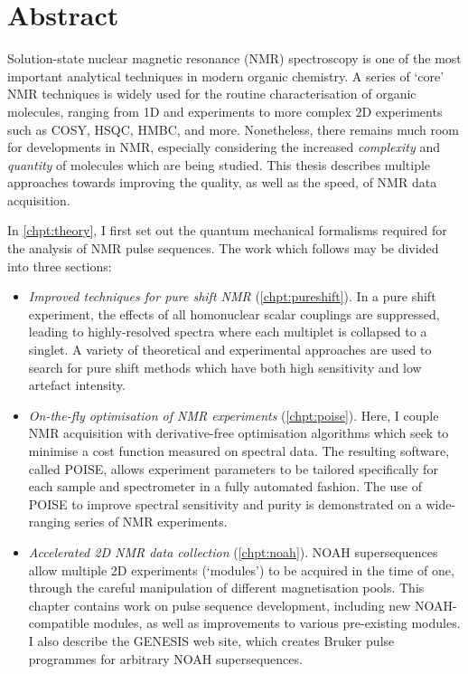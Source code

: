 \chapter{Abstract}

Solution-state nuclear magnetic resonance (NMR) spectroscopy is one of the most important analytical techniques in modern organic chemistry.
A series of `core' NMR techniques is widely used for the routine characterisation of organic molecules, ranging from 1D \proton{} and \carbon{} experiments to more complex 2D experiments such as COSY, HSQC, HMBC, and more.
Nonetheless, there remains much room for developments in NMR, especially considering the increased \textit{complexity} and \textit{quantity} of molecules which are being studied.
This thesis describes multiple approaches towards improving the quality, as well as the speed, of NMR data acquisition.

In \cref{chpt:theory}, I first set out the quantum mechanical formalisms required for the analysis of NMR pulse sequences.
The work which follows may be divided into three sections:

\begin{itemize}
    \item \textit{Improved techniques for pure shift NMR} (\cref{chpt:pureshift}).
        In a pure shift experiment, the effects of all homonuclear scalar couplings are suppressed, leading to highly-resolved spectra where each multiplet is collapsed to a singlet.
        A variety of theoretical and experimental approaches are used to search for pure shift methods which have both high sensitivity and low artefact intensity.
        
    \item \textit{On-the-fly optimisation of NMR experiments} (\cref{chpt:poise}).
        Here, I couple NMR acquisition with derivative-free optimisation algorithms which seek to minimise a cost function measured on spectral data.
        The resulting software, called POISE, allows experiment parameters to be tailored specifically for each sample and spectrometer in a fully automated fashion.
        The use of POISE to improve spectral sensitivity and purity is demonstrated on a wide-ranging series of NMR experiments.

    \item \textit{Accelerated 2D NMR data collection} (\cref{chpt:noah}).
        NOAH supersequences allow multiple 2D experiments (`modules') to be acquired in the time of one, through the careful manipulation of different magnetisation pools.
        This chapter contains work on pulse sequence development, including new NOAH-compatible modules, as well as improvements to various pre-existing modules.
        I also describe the GENESIS web site, which creates Bruker pulse programmes for arbitrary NOAH supersequences.
\end{itemize}
